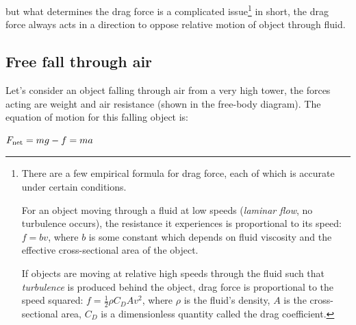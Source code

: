 but what determines the drag force is a complicated issue\footnote[][-2cm]{There are a few empirical formula for drag force, each of which is accurate under certain conditions.
	
For an object moving through a fluid at low speeds (\emph{laminar flow}, no turbulence occurs), the resistance it experiences is proportional to its speed: $f=bv$, where $b$ is some constant which depends on fluid viscosity and the effective cross-sectional area of the object.
	
If objects are moving at relative high speeds through the fluid such that \emph{turbulence} is produced behind the object, drag force is proportional to the speed squared: $ f = \frac{1}{2} \rho C_D A v^2$, where $\rho$ is the fluid's density, $A$ is the cross-sectional area, $C_D$ is a dimensionless quantity called the drag coefficient.}
in short, the drag force always acts in a direction to oppose relative motion of object through fluid.

\subsection*{Free fall through air}

\begin{marginfigure}
	\vspace*{-16pt}
	\centering
	\vspace*{-16pt}
\end{marginfigure}

Let's consider an object falling through air from a very high tower, the forces acting are weight and air resistance (shown in the free-body diagram). The equation of motion for this falling object is:

{
	\centering
	
	$ F_\text{net} = mg - f = ma $
	
}

